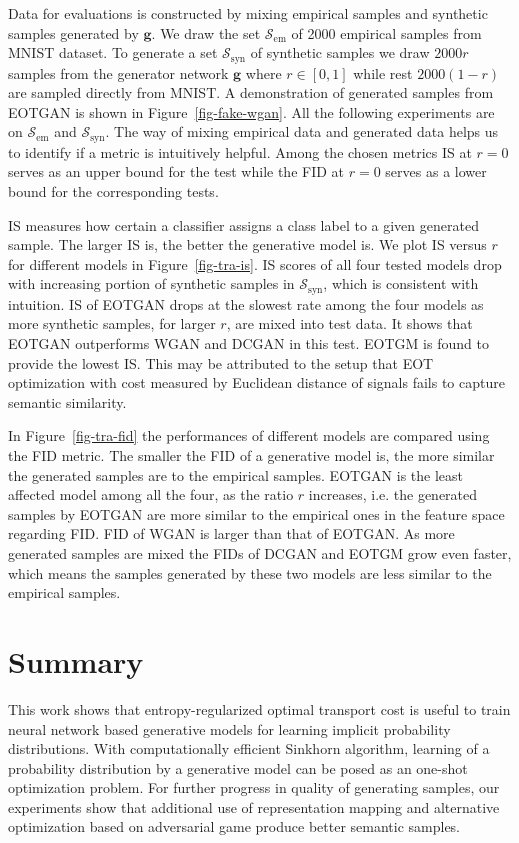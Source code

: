 Data for evaluations is constructed by mixing empirical samples and
synthetic samples generated by $\bm{g}$. We draw the set $\mathcal{S}_{\mathrm{em}}$ of 2000 empirical samples from MNIST dataset. To generate a set $\mathcal{S}_{\mathrm{syn}}$ of synthetic
samples we draw $2000r$ samples from the generator network $\bm{g}$ where
$r\in[0,1]$ while rest $2000(1-r)$ are sampled directly from
MNIST. A demonstration of generated samples from EOTGAN is shown in Figure~\ref{fig-fake-wgan}.
All the following experiments are on
$\mathcal{S}_{\mathrm{em}}$ and $\mathcal{S}_{\mathrm{syn}}$. 
The way of mixing empirical data and generated data helps
us to identify if a metric is intuitively helpful. Among the chosen metrics IS at $r=0$ serves as an upper bound for the test while the FID at $r=0$ serves as a lower bound for the corresponding tests. 

IS measures how certain a classifier assigns a class label to a given
generated sample. The larger IS is, the better the generative model
is. We plot IS versus $r$ for different models in
Figure~\ref{fig-tra-is}. IS scores of all four tested models drop with
increasing portion of synthetic samples in
$\mathcal{S}_{\mathrm{syn}}$, which is consistent with intuition. IS
of EOTGAN drops at the slowest rate among the four models as more
synthetic samples, for larger $r$, are mixed into test data. It shows
that EOTGAN outperforms WGAN and DCGAN in this test. EOTGM is found to provide the lowest IS.
This may be attributed to the setup that 
EOT optimization with cost measured by Euclidean distance of signals
fails to capture semantic similarity.

In Figure~\ref{fig-tra-fid} the performances of different models are
compared using the FID metric. The smaller the FID of a generative model is, the more similar the
generated samples are to the empirical samples. EOTGAN is the least affected model among all the four, as the ratio $r$ increases, i.e. the generated samples by EOTGAN are more similar to the empirical
ones in the feature space regarding FID. FID of WGAN is larger than that of EOTGAN. As
more generated samples are mixed the FIDs of DCGAN and EOTGM grow
even faster, which means the samples generated by these two models are
less similar to the empirical samples.

\section{Summary}
This work shows that entropy-regularized optimal transport cost is
useful to train neural network based generative models for learning implicit probability
distributions. With computationally efficient Sinkhorn algorithm,
learning of a probability distribution by a generative model can be
posed as an one-shot optimization problem. For further progress in
quality of generating samples, our experiments show that additional use of
representation mapping and alternative optimization based on
adversarial game produce better
semantic samples. 


